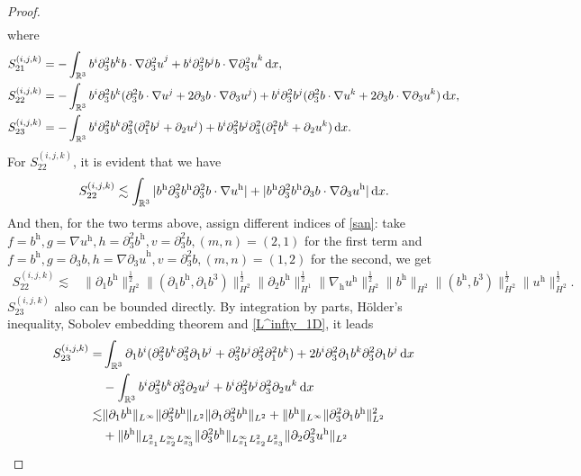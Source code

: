 \documentclass[11pt]{amsart}
\theoremstyle{definition}
\newcommand{\R}{\mathbb{R}}
\newcommand{\h}{\mathrm{h}}
\newcommand{\dx}{\,{\rm d}x}
\newcommand{\nablah}{\nabla_{\mathrm{h}}}
\numberwithin{equation}{section}
\begin{document}
\begin{proof}
\begin{align*}
	\end{align*}
	where
	\begin{align*}
		S^{(i,j,k)}_{21}&=-\int_{\R^3} b^i\partial_3^2b^k b\cdot\nabla{\partial_3^2u}^j+b^i\partial_3^2b^jb\cdot\nabla{\partial_3^2u}^k\dx,\\
		S^{(i,j,k)}_{22}&=-\int_{\R^3} b^i\partial_3^2b^k(\partial_3^2 b\cdot\nabla{u}^j+2\partial_3 b\cdot\nabla{\partial_3u}^j)+b^i\partial_3^2b^j(\partial_3^2b\cdot\nabla{u}^k+2\partial_3b\cdot\nabla{\partial_3u}^k)\dx,\\
		S^{(i,j,k)}_{23}&=-\int_{\R^3} b^i\partial_3^2b^k\partial_3^2(\partial_1^2b^j +\partial_2u^j)+ b^i\partial_3^2b^j\partial_3^2(\partial_1^2b^k +\partial_2u^k)\dx.
	\end{align*}
	For $S^{(i,j,k)}_{22}$, it is evident that we have
	\begin{align*}
		S^{(i,j,k)}_{22}\lesssim\int_{\R^3} |b^\h\partial_3^2b^\h\partial_3^2 b\cdot\nabla{u}^\h|+|b^\h\partial_3^2b^\h\partial_3 b\cdot\nabla{\partial_3u}^\h|\dx.
	\end{align*}
	And then, for the two terms above, assign different indices of \eqref{san}: take $f=b^\h,g=\nabla{u}^\h,h=\partial_3^2b^\h,v=\partial_3^2 b,(m,n)=(2,1)$ for the first term and $f=b^\h,g=\partial_3 b,h=\nabla{\partial_3u}^\h,v=\partial_3^2 b,(m,n)=(1,2)$ for the second, we get
	\begin{align}\label{S22}
		S^{(i,j,k)}_{22}
		\lesssim&\|\partial_1b^\h\|_{H^2}^\frac12\|(\partial_1b^\h,\partial_1b^3)\|_{H^2}^\frac12\|\partial_2b^\h\|_{H^1}^\frac12\|\nablah u^\h\|_{H^2}^\frac12\|b^\h\|_{H^2}\|(b^\h,b^3)\|_{H^2}^\frac12\|u^\h\|_{H^2}^\frac12.
	\end{align}
	$S^{(i,j,k)}_{23}$ also can be bounded directly. By  integration by parts, H\"older's inequality, Sobolev embedding theorem and \eqref{L^infty_1D}, it leads
	\begin{align}\label{S23}
		S^{(i,j,k)}_{23}=&\int_{\R^3} \partial_1b^i(\partial_3^2b^k\partial_3^2\partial_1b^j + \partial_3^2b^j\partial_3^2\partial_1^2b^k) +2b^i\partial_3^2\partial_1b^k\partial_3^2\partial_1b^j\dx\nonumber\\
		&-\int_{\R^3} b^i\partial_3^2b^k\partial_3^2\partial_2u^j+ b^i\partial_3^2b^j\partial_3^2\partial_2u^k\dx\nonumber\\
		\lesssim&\|\partial_1b^\h\|_{L^\infty}\|\partial_3^2b^\h\|_{L^2}\|\partial_1\partial_3^2b^\h\|_{L^2}+\|b^\h\|_{L^\infty}\|\partial_3^2\partial_1b^\h\|_{L^2}^2\nonumber\\
		&+\|b^\h\|_{L^2_{x_1}L^\infty_{x_2}L^\infty_{x_3}}\|\partial_3^2b^\h\|_{L^\infty_{x_1}L^2_{x_2}L^2_{x_3}}\|\partial_2\partial_3^2u^\h\|_{L^2}\nonumber\\

\end{align}
\end{proof}
\end{document}
